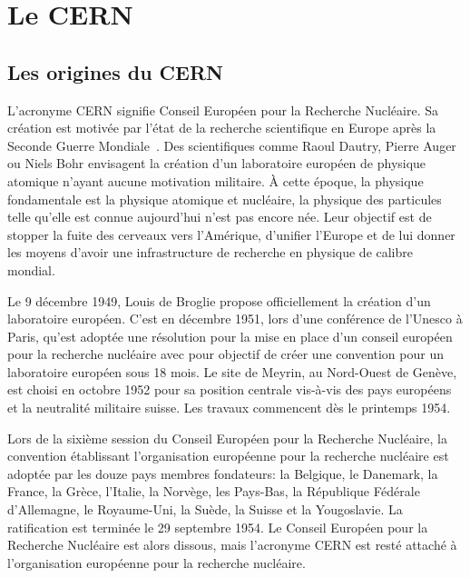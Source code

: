 \section{Le CERN}\label{chapter-LHC-section-CERN}
\subsection{Les origines du CERN}
L'acronyme \og CERN \fg{} signifie Conseil Européen pour la Recherche Nucléaire.
Sa création est motivée par l'état de la recherche scientifique en Europe après la Seconde Guerre Mondiale~\cite{CERN_website}.
Des scientifiques comme Raoul Dautry, Pierre Auger ou Niels Bohr envisagent la création d'un laboratoire européen de physique atomique n'ayant aucune motivation militaire.
À cette époque, la physique fondamentale est la physique atomique et nucléaire, la physique des particules telle qu'elle est connue aujourd'hui n'est pas encore née.
Leur objectif est de stopper la fuite des cerveaux vers l'Amérique, d'unifier l'Europe et de lui donner les moyens d'avoir une infrastructure de recherche en physique de calibre mondial.
\par Le 9 décembre 1949, Louis de Broglie propose officiellement la création d'un laboratoire européen.
C'est en décembre 1951, lors d'une conférence de l'Unesco à Paris, qu'est adoptée une résolution pour la mise en place d'un conseil européen pour la recherche nucléaire avec pour objectif de créer une convention pour un laboratoire européen sous 18 mois.
Le site de Meyrin, au Nord-Ouest de Genève, est choisi en octobre 1952 pour sa position centrale vis-à-vis des pays européens et la neutralité militaire suisse. Les travaux commencent dès le printemps 1954.
\par Lors de la sixième session du Conseil Européen pour la Recherche Nucléaire, la convention établissant l'organisation européenne pour la recherche nucléaire est adoptée par les douze pays membres fondateurs: la Belgique, le Danemark, la France, la Grèce, l'Italie, la Norvège, les Pays-Bas, la République Fédérale d'Allemagne, le Royaume-Uni, la Suède, la Suisse et la Yougoslavie.
La ratification est terminée le 29 septembre 1954.
Le Conseil Européen pour la Recherche Nucléaire est alors dissous, mais l'acronyme CERN est resté attaché à l'organisation européenne pour la recherche nucléaire.
